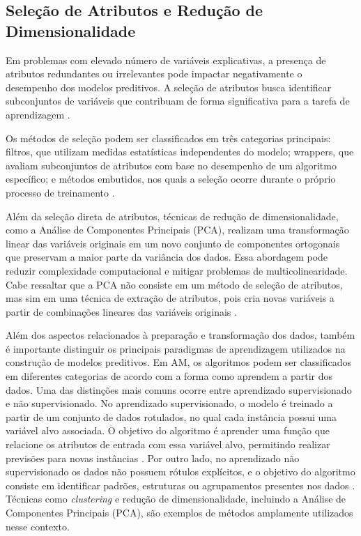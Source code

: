 \subsection{Seleção de Atributos e Redução de Dimensionalidade}

Em problemas com elevado número de variáveis explicativas, a presença de atributos redundantes ou irrelevantes pode impactar negativamente 
o desempenho dos modelos preditivos. A seleção de atributos busca identificar subconjuntos de variáveis que contribuam de forma significativa para 
a tarefa de aprendizagem \cite{Liu2010}.

Os métodos de seleção podem ser classificados em três categorias principais: filtros, que utilizam medidas estatísticas independentes do modelo; 
wrappers, que avaliam subconjuntos de atributos com base no desempenho de um algoritmo específico; e métodos embutidos, nos quais a seleção ocorre 
durante o próprio processo de treinamento \cite{Guyon2006}.

Além da seleção direta de atributos, técnicas de redução de dimensionalidade, como a Análise de Componentes Principais (PCA), 
realizam uma transformação linear das variáveis originais em um novo conjunto de componentes ortogonais que preservam a maior parte da variância dos dados. 
Essa abordagem pode reduzir complexidade computacional e mitigar problemas de multicolinearidade. Cabe ressaltar que a PCA não consiste em um método 
de seleção de atributos, mas sim em uma técnica de extração de atributos, pois cria novas variáveis a partir de combinações lineares das variáveis originais \cite{Guyon2006}.

Além dos aspectos relacionados à preparação e transformação dos dados, também é importante distinguir os principais paradigmas de 
aprendizagem utilizados na construção de modelos preditivos. Em AM, os algoritmos podem ser classificados em diferentes categorias de acordo com a forma 
como aprendem a partir dos dados. Uma das distinções mais comuns ocorre entre aprendizado supervisionado e não supervisionado. 
No aprendizado supervisionado, o modelo é treinado a partir de um conjunto de dados rotulados, no qual cada instância possui uma variável alvo associada. 
O objetivo do algoritmo é aprender uma função que relacione os atributos de entrada com essa variável alvo, permitindo realizar previsões para novas instâncias \cite{Geron2019}. 
Por outro lado, no aprendizado não supervisionado os dados não possuem rótulos explícitos, e o objetivo do algoritmo consiste em identificar padrões, estruturas ou agrupamentos 
presentes nos dados \cite{Geron2019}. Técnicas como \textit{clustering} e redução de dimensionalidade, incluindo a Análise de Componentes Principais (PCA), 
são exemplos de métodos amplamente utilizados nesse contexto.

